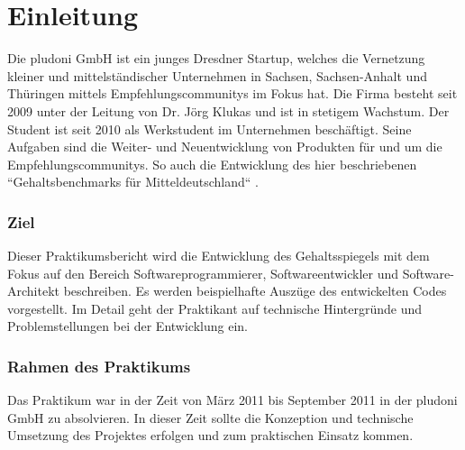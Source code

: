 \part{Einleitung}
Die pludoni GmbH ist ein junges Dresdner Startup, welches die Vernetzung kleiner und mittelständischer Unternehmen in Sachsen, Sachsen-Anhalt und Thüringen 
mittels Empfehlungscommunitys im Fokus hat. Die Firma besteht seit 2009 unter der Leitung von Dr. Jörg Klukas und ist in stetigem Wachstum. 
Der Student ist seit 2010 als Werkstudent im Unternehmen beschäftigt. Seine Aufgaben sind die Weiter- und Neuentwicklung von Produkten für und um die Empfehlungscommunitys. 
So auch die Entwicklung des hier beschriebenen ``Gehaltsbenchmarks für
Mitteldeutschland`` \citep{Gehaltsbenchmark}.
\section{Ziel}
Dieser Praktikumsbericht wird die Entwicklung des Gehaltsspiegels mit dem Fokus auf den Bereich Softwareprogrammierer, Softwareentwickler und Software-Architekt beschreiben. 
Es werden beispielhafte Auszüge des entwickelten Codes vorgestellt. Im Detail geht der Praktikant auf technische Hintergründe und Problemstellungen bei der Entwicklung ein.
\section{Rahmen des Praktikums}
Das Praktikum war in der Zeit von März 2011 bis September 2011 in der pludoni GmbH zu absolvieren. 
In dieser Zeit sollte die Konzeption und technische Umsetzung des Projektes erfolgen und zum praktischen Einsatz kommen.
